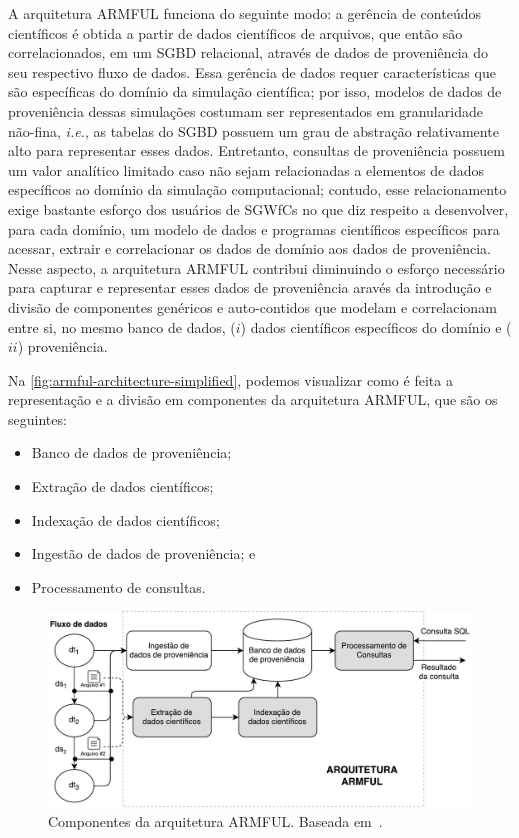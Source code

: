 A arquitetura ARMFUL funciona do seguinte modo: a gerência de conteúdos científicos é obtida a partir de dados científicos de arquivos, que então são correlacionados, em um SGBD relacional, através de dados de proveniência do seu respectivo fluxo de dados. Essa gerência de dados requer características que são específicas do domínio da simulação científica; por isso, modelos de dados de proveniência dessas simulações costumam ser representados em granularidade não-fina, \textit{i.e.}, as tabelas do SGBD possuem um grau de abstração relativamente alto para representar esses dados. Entretanto, consultas de proveniência possuem um valor analítico limitado caso não sejam relacionadas a elementos de dados específicos ao domínio da simulação computacional; contudo, esse relacionamento exige bastante esforço dos usuários de SGWfCs no que diz respeito a desenvolver, para cada domínio, um modelo de dados e programas científicos específicos para acessar, extrair e correlacionar os dados de domínio aos dados de proveniência. Nesse aspecto, a arquitetura ARMFUL contribui diminuindo o esforço necessário para capturar e representar esses dados de proveniência aravés da introdução e divisão de componentes genéricos e auto-contidos que modelam e correlacionam entre si, no mesmo banco de dados, (\(i\)) dados científicos específicos do domínio e (\(ii\)) proveniência.

Na \autoref{fig:armful-architecture-simplified}, podemos visualizar como é feita a representação e a divisão em componentes da arquitetura ARMFUL, que são os seguintes:

\begin{itemize}
    \item Banco de dados de proveniência;
    \item Extração de dados científicos;
    \item Indexação de dados científicos;
    \item Ingestão de dados de proveniência; e
    \item Processamento de consultas.
\end{itemize}

\begin{figure}[ht]
    \centering
    \includegraphics[width=\textwidth]{img/armful-architecture-simplified}
    \caption[Componentes da arquitetura ARMFUL]{Componentes da arquitetura ARMFUL. Baseada em~\cite{silva2017raw}.}%
    \label{fig:armful-architecture-simplified}
\end{figure}

